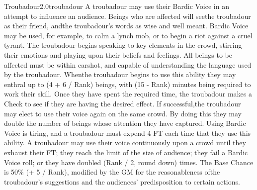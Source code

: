 \begin{skill}{Troubadour}{2.0}{troubadour}
A troubadour may use their Bardic Voice in an attempt to influence an
audience. Beings who are affected will seethe troubadour as their
friend, andthe troubadour's words as wise and well meant. Bardic
Voice may be used, for example, to calm a lynch mob, or to begin a
riot against a cruel tyrant. The troubadour begins speaking to key
elements in the crowd, stirring their emotions and playing upon their
beliefs and feelings. All beings to be affected must be within
earshot, and capable of understanding the language used by the
troubadour. Whenthe troubadour begins to use this ability they may
enthral up to (4 + 6 / Rank) beings, with (15 - Rank) minutes being
required to work their skill. Once they have spent the required time,
the troubadour makes a Check to see if they are having the desired
effect. If successful,the troubadour may elect to use their voice
again on the same crowd. By doing this they may double the number of
beings whose attention they have captured. Using Bardic Voice is
tiring, and a troubadour must expend 4 FT each time that they use this
ability. A troubadour may use their voice continuously upon a crowd
until they exhaust their FT; they reach the limit of the size of
audience; they fail a Bardic Voice roll; or they have doubled (Rank /
2, round down) times. The Base Chance is 50\% (+ 5 / Rank), modified
by the GM for the reasonableness ofthe troubadour's suggestions and
the audiences' predisposition to certain actions.

\end{skill}
